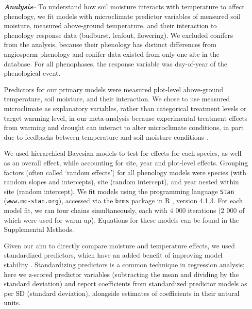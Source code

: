 \documentclass{article}
\begin{document}
\par\textbf {\emph{Analysis}}--
To understand how soil moisture interacts with temperature to affect phenology, we fit models with microclimate predictor variables of measured soil moisture, measured above-ground temperature, and their interaction to phenology response data (budburst, leafout, flowering). We excluded conifers from the analysis, because their phenology has distinct differences from angiosperm phenology \cite{polgar2014} and conifer data existed from only one site in the database. For all phenophases, the response variable was day-of-year of the phenological event. 
\par Predictors for our primary models were measured plot-level above-ground temperature, soil moisture, and their interaction. We chose to use measured microclimate as explanatory variables, rather than categorical treatment levels or target warming level, in our meta-analysis because experimental treatment effects from warming and drought can interact to alter microclimate conditions, in part due to feedbacks between temperature and soil moisture conditions \citep{ettinger2019,mcdaniel2014}.
 
\par We used hierarchical Bayesian models to test for effects for each species, as well as an overall effect, while accounting for site, year and plot-level effects. Grouping factors (often called `random effects') for all phenology models were species (with random slopes and intercepts), site (random intercept), and year nested within site (random intercept). We fit models using the programming language \texttt{Stan} \citep{Carpenter:2016aa} (\texttt{www.mc-stan.org}), accessed via the \texttt{brms}\citep{burkner2021} package in R \citep{rcoreteam2022}, version 4.1.3. For each model fit, we ran four chains simultaneously, each with 4 000 iterations (2 000 of which were used for warm-up). Equations for these models can be found in the Supplemental Methods. 

\par Given our aim to directly compare moisture and temperature effects, we used standardized predictors, which have an added benefit of improving model stability \citep{gelman2007}. Standardizing predictors is a common technique in regression analysis; here we z-scored predictor variables (subtracting the mean and dividing by the standard deviation) and report coefficients from standardized predictor models as per SD (standard deviation), alongside estimates of coefficients in their natural units. 
\end{document}
